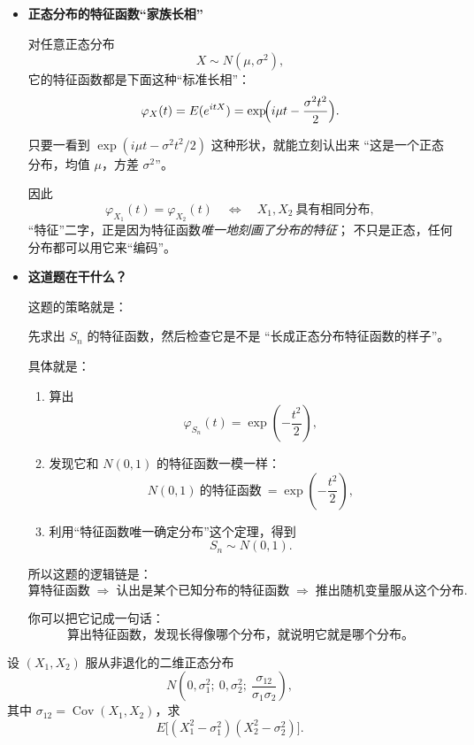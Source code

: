 \begin{dxtips}

\begin{itemize}
  \item \textbf{正态分布的特征函数“家族长相”}

  对任意正态分布
  \[
    X\sim N(\mu,\sigma^2),
  \]
  它的特征函数都是下面这种“标准长相”：
  \[
    \varphi_X(t)=E(e^{itX})
    =\exp\!\Bigl(i\mu t-\frac{\sigma^2 t^2}{2}\Bigr).
  \]

  只要一看到 $\exp(i\mu t - \sigma^2 t^2/2)$ 这种形状，就能立刻认出来
  “这是一个正态分布，均值 $\mu$，方差 $\sigma^2$”。

  因此
  \[
    \varphi_{X_1}(t)=\varphi_{X_2}(t)\quad\Longleftrightarrow\quad
    X_1,X_2\ \text{具有相同分布},
  \]
  “特征”二字，正是因为特征函数\emph{唯一地刻画了分布的特征}；
  不只是正态，任何分布都可以用它来“编码”。

  \item \textbf{这道题在干什么？}

  这题的策略就是：

  先求出 $S_n$ 的特征函数，然后检查它是不是
  “长成正态分布特征函数的样子”。

  具体就是：
  \begin{enumerate}
    \item 算出
    \[
      \varphi_{S_n}(t)
      =\exp\!\left(-\frac{t^2}{2}\right),
    \]
    \item 发现它和 $N(0,1)$ 的特征函数一模一样：
    \[
      N(0,1)\ \text{的特征函数}\
      =\exp\!\left(-\frac{t^2}{2}\right),
    \]
    \item 利用“特征函数唯一确定分布”这个定理，得到
    \[
      S_n\sim N(0,1).
    \]
  \end{enumerate}

  所以这题的逻辑链是：
  \[
    \text{算特征函数}
    \;\Longrightarrow\;
    \text{认出是某个已知分布的特征函数}
    \;\Longrightarrow\;
    \text{推出随机变量服从这个分布}.
  \]

  你可以把它记成一句话：
  \[
    \boxed{\text{算出特征函数，发现长得像哪个分布，就说明它就是哪个分布。}}
  \]
\end{itemize}
\end{dxtips}
\begin{homework}[4.12]
设 $(X_1,X_2)$ 服从非退化的二维正态分布
\[
N\!\left(0,\sigma_1^{2};\ 0,\sigma_2^{2};\ \frac{\sigma_{12}}{\sigma_1\sigma_2}\right),
\]
其中 $\sigma_{12}=\operatorname{Cov}(X_1,X_2)$，求
\[
E\bigl[(X_1^{2}-\sigma_1^{2})(X_2^{2}-\sigma_2^{2})\bigr].
\]
\end{homework}
